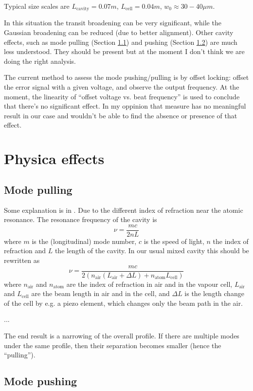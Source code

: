 \documentclass[11pt,a4paper]{article}
\begin{document}
Typical size scales are $L_\mathrm{ cavity} = 0.07 m$, $L_\mathrm{ cell} = 0.04 m$, $w_0 \approx 30-40 \mu m$.

In this situation the transit broadening can be very significant, while the Gaussian broadening can be reduced (due to better alignment). Other cavity effects, such as mode pulling (Section \ref{ssec:modepull}) and pushing (Section \ref{ssec:modepush}) are much less understood. They should be present but at the moment I don't think we are doing the right analysis.

The current method to assess the mode pushing/pulling is by offset locking: offset the error signal with a given voltage, and observe the output frequency. At the moment, the linearity of ``offset voltage vs. beat frequency'' is used to conclude that there's no significant effect. In my oppinion that measure has no meaningful result in our case and wouldn't be able to find the absence or presence of that effect.

\section{Physica effects}
\subsection{Mode pulling}
\label{ssec:modepull}

Some explanation is in \cite{Lindberg1999}.
Due to the different index of refraction near the atomic resonance. The resonance frequency of the cavity is
\begin{equation}
\nu = \frac{m c}{2 n L}
\end{equation}
where $m$ is the (longitudinal) mode number, $c$ is the speed of light, $n$ the index of refraction and $L$ the length of the cavity. In our usual mixed cavity this should be rewritten as
\begin{equation}
\nu = \frac{m c}{2 \left(n_\mathrm{air} (L_\mathrm{air} + \Delta L) + n_\mathrm{atom} L_\mathrm{cell}\right)}
\end{equation}
where $n_\mathrm{air}$ and $n_\mathrm{atom}$ are the index of refraction in air and in the vapour cell, $L_\mathrm{air}$ and $L_\mathrm{cell}$ are the beam length in air and in the cell, and $\Delta L$ is the length change of the cell by e.g. a piezo element, which changes only the beam path in the air.

...

The end result is a narrowing of the overall profile. If there are multiple modes under the same profile, then their separation becomes smaller (hence the ``pulling'').

\subsection{Mode pushing}
\label{ssec:modepush}



\end{document}
